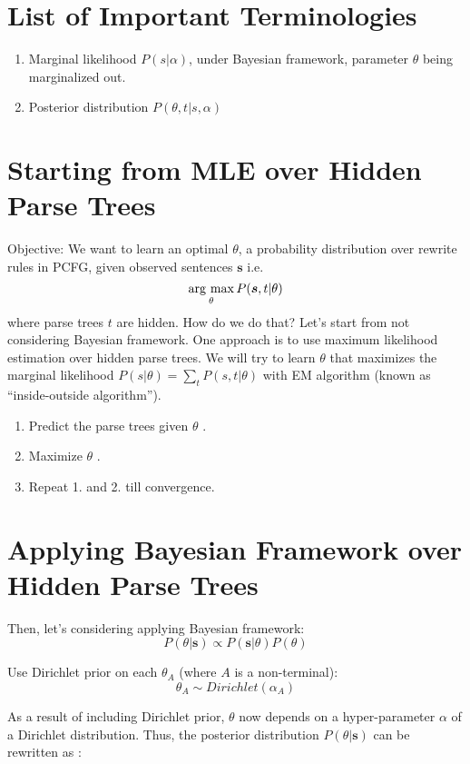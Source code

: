 \documentclass[11pt]{article}
\newcommand{\argmax}{\mathop{\rm arg~max}\limits}
\begin{document}
\section{List of Important Terminologies}
\begin{enumerate}
 \item Marginal likelihood $P(s|\alpha)$, under Bayesian framework, parameter $\theta$ being marginalized out.
 \item Posterior distribution $P(\theta,t|s,\alpha)$ 
\end{enumerate}

\section{Starting from MLE over Hidden Parse Trees}
Objective: We want to learn an optimal $\theta$, a probability distribution over rewrite rules in PCFG, given observed sentences $\boldsymbol{s}$ i.e. 
$$
\argmax_{\theta} P(\boldsymbol{s}, t|\theta)
$$
where parse trees $t$ are hidden. How do we do that? Let's start from not considering Bayesian framework. One approach is to use maximum likelihood estimation over hidden parse trees. We will try to learn $\theta$ that maximizes the marginal likelihood $P(s|\theta) = \sum_t P(s, t|\theta)$ with EM algorithm (known as ``inside-outside algorithm'').
\begin{enumerate}
 \item Predict the parse trees given $\theta$ \cite{learning_tree_annotation}.
 \item Maximize $\theta$ \cite{learning_tree_annotation}.
 \item Repeat 1. and 2. till convergence.
\end{enumerate}


\section{Applying Bayesian Framework over Hidden Parse Trees}
Then, let's considering applying Bayesian framework:
$$
P(\theta|\boldsymbol{s}) \propto P(\boldsymbol{s}|\theta) P(\theta)
$$

Use Dirichlet prior on each $\theta_A$ (where $A$ is a non-terminal):
$$
\theta_A \sim Dirichlet(\alpha_A) 
$$

As a result of including Dirichlet prior, $\theta$ now depends on a hyper-parameter $\alpha$ of a Dirichlet distribution. Thus, the posterior distribution $P(\theta|\boldsymbol{s})$ can be rewritten as \cite{cohen-johnson:2013:ACL2013}:
\end{document}
